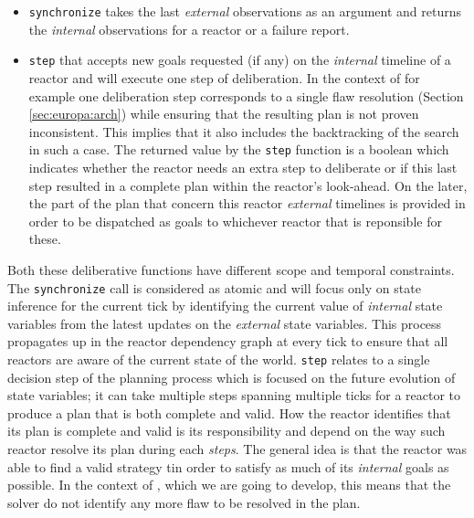 \begin{itemize}

\item \texttt{synchronize} takes the last {\em external} observations
  as an argument and returns the {\em internal} observations for a
  reactor or a failure report.

\item \texttt{step} that accepts new goals requested (if any) on the
  {\em internal} timeline of a reactor and will execute one step of
  deliberation. In the context of \eu for example one deliberation
  step corresponds to a single flaw resolution (Section
  \ref{sec:europa:arch}) while ensuring that the resulting plan is not
  proven inconsistent. This implies that it also includes the
  backtracking of the search in such a case.  The returned value by
  the \texttt{step} function is a boolean which indicates whether the
  reactor needs an extra step to deliberate or if this last step
  resulted in a complete plan within the reactor's look-ahead. On the
  later, the part of the plan that concern this reactor {\em external}
  timelines is provided in order to be dispatched as goals to
  whichever reactor that is reponsible for these. %
\end{itemize}

Both these deliberative functions have different scope and temporal
constraints. The \texttt{synchronize} call is considered as atomic and
will focus only on state inference for the current tick by identifying
the current value of {\em internal} state variables from the latest
updates on the {\em external} state variables. This process propagates
up in the reactor dependency graph at every tick to ensure that all
reactors are aware of the current state of the world. \texttt{step}
relates to a single decision step of the planning process which is
focused on the future evolution of state variables; it can take
multiple steps spanning multiple ticks for a reactor to produce a plan
that is both complete and valid. How the reactor identifies that its
plan is complete and valid is its responsibility and depend on the way
such reactor resolve its plan during each {\em steps}. The general
idea is that the reactor was able to find a valid strategy tin order
to satisfy as much of its {\em internal} goals as possible. In the
context of \eu, which we are going to develop, this means that the
solver do not identify any more flaw to be resolved in the plan.

